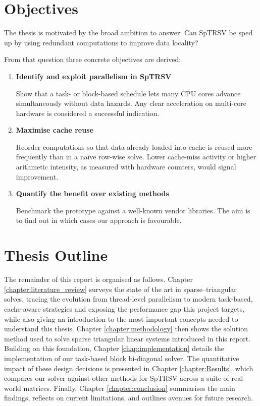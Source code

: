 \section{Objectives}
\label{chap:intro_objectives}
The thesis is motivated by the broad ambition to answer:
Can SpTRSV be sped up by using redundant computations to improve data locality?

From that question three concrete objectives are derived:
\begin{enumerate}
    \item \textbf{Identify and exploit parallelism in SpTRSV }
    
    Show that a task- or block-based schedule lets many CPU cores
    advance simultaneously without data hazards.  
    Any clear acceleration on multi-core hardware is considered a successful
    indication.
    \item \textbf{Maximise cache reuse}
    
    Reorder computations so that data already loaded into cache is reused
    more frequently than in a naïve row-wise solve.  
    Lower cache-miss activity or higher arithmetic intensity, as measured
    with hardware counters, would signal improvement.
    \item \textbf{Quantify the benefit over existing methods}
    
    Benchmark the prototype against a well-known vendor libraries. The aim is to find out in which cases our approach is favourable. 
\end{enumerate}


\section{Thesis Outline}
\label{chap:intro_overview}
The remainder of this report is organised as follows.
Chapter \ref{chapter:literature_review} surveys the state of the art in sparse–triangular solves, tracing the evolution from thread-level parallelism to modern task-based, cache-aware strategies and exposing the performance gap this project targets, while also giving an introduction to the most important concepts needed to understand this thesis.
Chapter \ref{chapter:methodology} then shows the solution method used to solve sparse triangular linear systems introduced in this report.
Building on this foundation, Chapter \ref{chap:implementation} details the implementation of our task-based block bi-diagonal solver. 
The quantitative impact of these design decisions is presented in Chapter \ref{chapter:Results}, which compares our solver against other methods for SpTRSV across a suite of real-world matrices. Finally, Chapter \ref{chapter:conclusion} summarises the main findings, reflects on current limitations, and outlines avenues for future research.